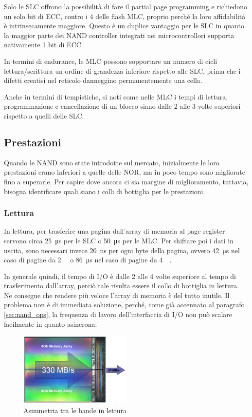 \documentclass[11pt,4paper]{report}
\begin{document}
Solo le SLC offrono la possibilità di fare il partial page programming e richiedono un solo bit di ECC, contro i 4 delle flash MLC, proprio perché la loro affidabilità è intrinsecamente maggiore. Questo è un duplice vantaggio per le SLC in quanto la maggior parte dei NAND controller integrati nei microcontrollori supporta nativamente 1 bit di ECC.

In termini di endurance, le MLC possono sopportare un numero di cicli lettura/scrittura un ordine di grandezza inferiore rispetto alle SLC, prima che i difetti creatisi nel reticolo danneggino permanentemente una cella.

Anche in termini di tempistiche, si noti come nelle MLC i tempi di lettura, programmazione e cancellazione di un blocco siano dalle 2 alle 3 volte superiori rispetto a quelli delle SLC.

\subsection{Prestazioni}
Quando le NAND sono state introdotte sul mercato, inizialmente le loro prestazioni erano inferiori a quelle delle NOR, ma in poco tempo sono migliorate fino a superarle. Per capire dove ancora ci sia margine di miglioramento, tuttavia, bisogna identificare quali siano i colli di bottiglia per le prestazioni. 

\subsubsection{Lettura}
In lettura, per trasferire una pagina dall'array di memoria al page register servono circa \SI{25}{\micro\second} per le SLC o \SI{50}{\micro\second} per le MLC. Per shiftare poi i dati in uscita, sono necessari invece \SI{20}{\nano\second} per ogni byte della pagina, ovvero \SI{42}{\micro\second} nel caso di pagine da \SI{2}{\kilo\byte} o \SI{86}{\micro\second} nel caso di pagine da \SI{4}{\kilo\byte}. 

In generale quindi, il tempo di I/O è dalle 2 alle 4 volte superiore al tempo di trasferimento dall'array, perciò tale risulta essere il collo di bottiglia in lettura. Ne consegue che rendere più veloce l'array di memoria è del tutto inutile. Il problema non è di immediata soluzione, perché, come già accennato al paragrafo \ref{sec:nand_ops}, la frequenza di lavoro dell'interfaccia di I/O non può scalare facilmente in quanto asincrona. 

\begin{figure}[hbtp]
	\centering
	\includegraphics[width=0.5\textwidth]{memorie/jc_read_bn}
	\caption{Asimmetria tra le bande in lettura}
	\label{fig:jc_read_bn}
\end{figure}
\end{document}
